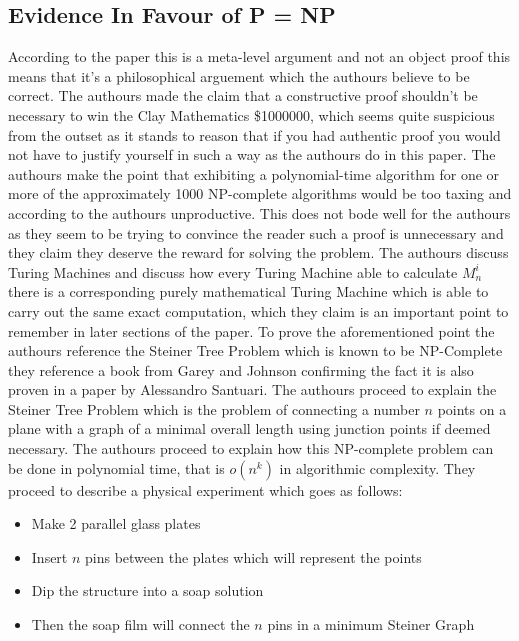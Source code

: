 \documentclass{report}
\begin{document}
\subsection{Evidence In Favour of P = NP}
According to the paper this is a meta-level argument and not an object proof\cite{PVsNPSolved} this means that it's a philosophical arguement which the authours believe to be correct.  The authours made the claim that a constructive proof shouldn't be necessary to win the Clay Mathematics \$1000000\cite{Millennium}, which seems quite suspicious from the outset as it stands to reason that if you had authentic proof you would not have to justify yourself in such a way as the authours do in this paper\cite{PVsNPSolved}.  The authours make the point that exhibiting a polynomial-time algorithm for one or more of the approximately 1000 NP-complete algorithms would be too taxing and according to the authours unproductive\cite{PVsNPSolved}.  This does not bode well for the authours as they seem to be trying to convince the reader such a proof is unnecessary and they claim they deserve the reward for solving the problem\cite{PVsNPSolved}.  The authours discuss Turing Machines and discuss how every Turing Machine able to calculate $M^i_n$ there is a corresponding purely mathematical Turing Machine which is able to carry out the same exact computation, which they claim is an important point to remember in later sections of the paper.  To prove the aforementioned point the authours reference the Steiner Tree Problem which is known to be NP-Complete they reference a book from Garey and Johnson confirming the fact\cite{GaeryJohnson} it is also proven in a paper by Alessandro Santuari\cite{Steiner}.  The authours proceed to explain the Steiner Tree Problem which is the problem of connecting a number $n$ points on a plane with a graph of a minimal overall length using junction points if deemed necessary\cite{Steiner}.  The authours proceed to explain how this NP-complete problem can be done in polynomial time, that is $o(n^k)$ in algorithmic complexity.  They proceed to describe a physical experiment\cite{PVsNPSolved} which goes as follows:
\begin{itemize}
  \item Make 2 parallel glass plates
  \item Insert $n$ pins between the plates which will represent the points
  \item Dip the structure into a soap solution
  \item Then the soap film will connect the $n$ pins in a minimum Steiner Graph
\end{itemize}
\end{document}
